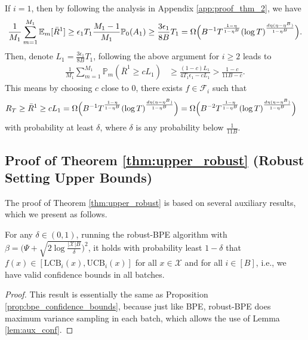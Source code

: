 \documentclass[10pt]{article}
\begin{document}
If $i=1$, then by following the analysis in Appendix \ref{app:proof_thm_2}, we have
\begin{align}
    \frac{1}{M_1}\sum_{m=1}^{M_1} \mathbb{E}_m[\bar{R}^1]
    \geq \epsilon_1 T_1 \frac{M_1-1}{M_1} \mathbb{P}_0(A_1)
    \geq \frac{3\epsilon_1}{8B} T_1
    = \Omega \Bigl(B^{-1} T^{\frac{1-\eta}{1-\eta^B}}(\log T)^{\frac{d\eta(\eta- \eta^B)}{1-\eta^B}}\Bigr).
\end{align}
Then, denote $L_1 = \frac{3\epsilon_1}{8B} T_1$, following the above argument for $i\geq 2$ leads to 
\begin{align}
    \frac{1}{M_1}\sum_{m=1}^{M_1}\mathbb{P}_m(\bar{R}^1\geq cL_1)
    & \geq \frac{(1-c)L_1}{4T_1\epsilon_1-cL_1}
    > \frac{1-c}{11B-c}.
\end{align}
This means by choosing $c$ close to $0$, there exists $f\in\mathcal{F}_i$ such that
\begin{align}
    R_T
    & \geq \bar{R}^1
    \geq cL_1
    = \Omega\Bigl(B^{-1}T^{\frac{1-\eta}{1-\eta^B}}(\log T)^{\frac{d\eta(\eta-\eta^B)}{1-\eta^B}} \Bigr)
    = \Omega\Bigl(B^{-2}T^{\frac{1-\eta}{1-\eta^B}}(\log T)^{\frac{d\eta(\eta-\eta^B)}{1-\eta^B}} \Bigr)
\end{align}
with probability at least $\delta$, where $\delta$ is any probability below $\frac{1}{11B}$. 


\subsection{Proof of Theorem \ref{thm:upper_robust} (Robust Setting Upper Bounds)}
\label{app:proof_upper_robust}

The proof of Theorem \ref{thm:upper_robust} is based on several auxiliary results, which we present as follows.

\begin{proposition}
    \label{prop:rbpe_confidence_bounds}
    For any $\delta \in (0,1)$,
    running the robust-BPE algorithm with $\beta = \bigl( \Psi + \sqrt{2 \log \frac{|\mathcal{X}| B}{\delta}} \bigr)^2$, it holds with probability least $1-\delta$ that $f(x)\in[\mathrm{LCB}_i(x),\mathrm{UCB}_i(x)]$ for all $x\in\mathcal{X}$ and for all $i\in[B]$, i.e., we have valid confidence bounds in all batches.
\end{proposition}
\begin{proof}
    This result is essentially the same as
    Proposition \ref{prop:bpe_confidence_bounds}, because just like BPE, robust-BPE does maximum variance sampling in each batch, which allows the use of Lemma \ref{lem:aux_conf}.
\end{proof}
\end{document}
